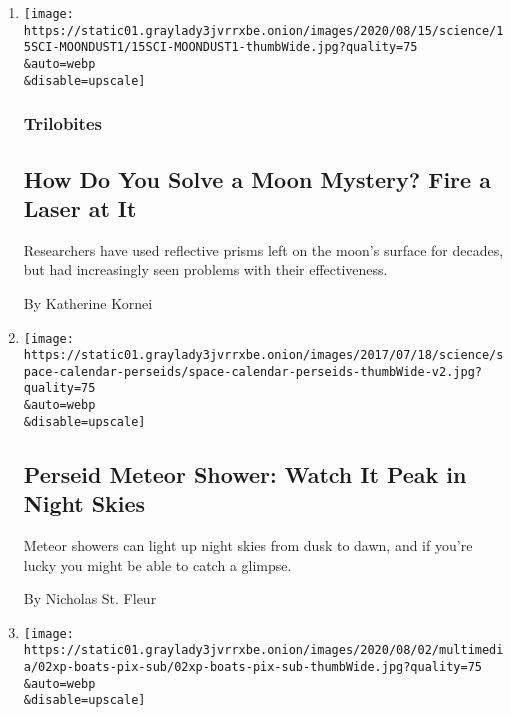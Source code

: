 \begin{enumerate}
\def\labelenumi{\arabic{enumi}.}
\item
  \href{/2020/08/15/science/moon-lasers-dust.html}{}

  \texttt{[image: https://static01.graylady3jvrrxbe.onion/images/2020/08/15/science/15SCI-MOONDUST1/15SCI-MOONDUST1-thumbWide.jpg?quality=75\\\&auto=webp\\\&disable=upscale]}

  \hypertarget{trilobites}{%
  \subsubsection{Trilobites}\label{trilobites}}

  \hypertarget{how-do-you-solve-a-moon-mystery-fire-a-laser-at-it}{%
  \subsection{How Do You Solve a Moon Mystery? Fire a Laser at
  It}\label{how-do-you-solve-a-moon-mystery-fire-a-laser-at-it}}

  Researchers have used reflective prisms left on the moon's surface for
  decades, but had increasingly seen problems with their effectiveness.

  By Katherine Kornei
\item
  \href{/2020/08/11/science/perseid-meteor-shower.html}{}

  \texttt{[image: https://static01.graylady3jvrrxbe.onion/images/2017/07/18/science/space-calendar-perseids/space-calendar-perseids-thumbWide-v2.jpg?quality=75\\\&auto=webp\\\&disable=upscale]}

  \hypertarget{perseid-meteor-shower-watch-it-peak-in-night-skies}{%
  \subsection{Perseid Meteor Shower: Watch It Peak in Night
  Skies}\label{perseid-meteor-shower-watch-it-peak-in-night-skies}}

  Meteor showers can light up night skies from dusk to dawn, and if
  you're lucky you might be able to catch a glimpse.

  By Nicholas St. Fleur
\item
  \href{/2020/08/02/us/flag-boat-SpaceX.html}{}

  \texttt{[image: https://static01.graylady3jvrrxbe.onion/images/2020/08/02/multimedia/02xp-boats-pix-sub/02xp-boats-pix-sub-thumbWide.jpg?quality=75\\\&auto=webp\\\&disable=upscale]}


\end{enumerate}
